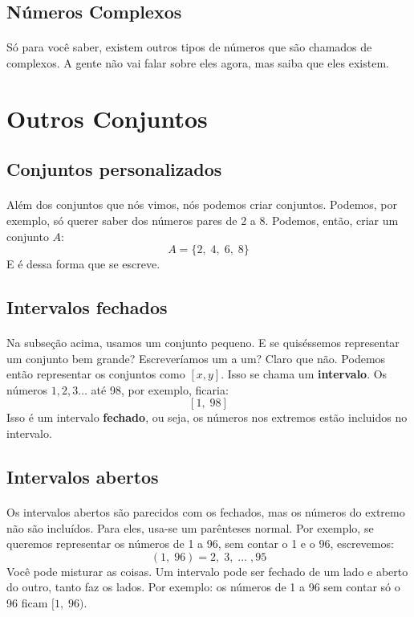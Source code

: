 \documentclass[11pt]{article}
\begin{document}
\subsection{Números Complexos}
\paragraph{}
Só para você saber, existem outros tipos de números que são chamados de 
complexos. A gente não vai falar sobre eles agora, mas saiba que eles existem.

\newpage


\section{Outros Conjuntos}
\subsection{Conjuntos personalizados}
\paragraph{}
Além dos conjuntos que nós vimos, nós podemos criar conjuntos. Podemos, por 
exemplo, só querer saber dos números pares de 2 a 8. Podemos, então, criar um
conjunto $A$:
$$A = \{2, \; 4, \; 6, \; 8\}$$
E é dessa forma que se escreve.

\subsection{Intervalos fechados}
\paragraph{}
Na subseção acima, usamos um conjunto pequeno. E se quiséssemos representar um
conjunto bem grande? Escreveríamos um a um? Claro que não. Podemos então
representar os conjuntos como $[x, y]$. Isso se chama um \textbf{intervalo}.
Os números $1,2,3\dots$ até 98, por exemplo, ficaria:
$$[1, \; 98]$$
Isso é um intervalo \textbf{fechado}, ou seja, os números nos extremos estão
incluidos no intervalo.

\subsection{Intervalos abertos}
\paragraph{}
Os intervalos abertos são parecidos com os fechados, mas os números do extremo
não são incluídos. Para eles, usa-se um parênteses normal. Por exemplo, se 
queremos representar os números de 1 a 96, sem contar o 1 e o 96, escrevemos:
$$(1, \; 96) = 2, \; 3, \; \dots \; , 95$$
Você pode misturar as coisas. Um intervalo pode ser fechado de um lado e 
aberto do outro, tanto faz os lados. Por exemplo: os números de 1 a 96 sem 
contar só o 96 ficam $[1, \; 96)$.
\end{document}
